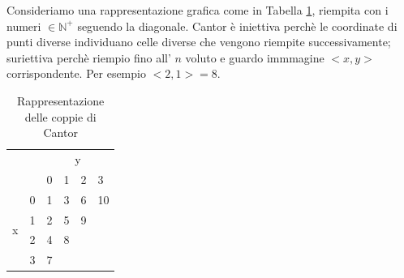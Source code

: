\documentclass{article}
\begin{document}
Consideriamo una rappresentazione grafica come in Tabella \ref{cantor}, riempita con i numeri $\in \mathbb{N}^{+}$ seguendo la diagonale. Cantor è iniettiva perchè le coordinate di punti diverse individuano celle diverse che vengono riempite successivamente; suriettiva perchè riempio fino all' $n$ voluto e guardo immmagine $<x,y>$ corrispondente.
Per esempio $ <2,1>=8 $.
\begin{center}
\begin{table}[]
\label{cantor}
\caption{Rappresentazione delle coppie di Cantor}
\begin{center}

\begin{tabular}{ll|llll}
\cline{3-6}
                                         &                        & \multicolumn{4}{c|}{y}                                                                            \\ \cline{3-6} 
                                         &                        & \multicolumn{1}{c|}{0} & \multicolumn{1}{l|}{1} & \multicolumn{1}{l|}{2} & \multicolumn{1}{l|}{3} \\ \hline
\multicolumn{1}{|l|}{\multirow{4}{*}{x}} & \multicolumn{1}{c|}{0} & 1                      & 3                      & 6                      & 10                     \\ \cline{2-2}
\multicolumn{1}{|l|}{}                   & 1                      & 2                      & 5                      & 9                      &                        \\ \cline{2-2}
\multicolumn{1}{|l|}{}                   & 2                      & 4                      & 8                      &                        &                        \\ \cline{2-2}
\multicolumn{1}{|l|}{}                   & 3                      & 7                      &                        &                        &                        \\ \cline{1-2}
\end{tabular}
\end{center}

\end{table}
\end{center}
\end{document}
